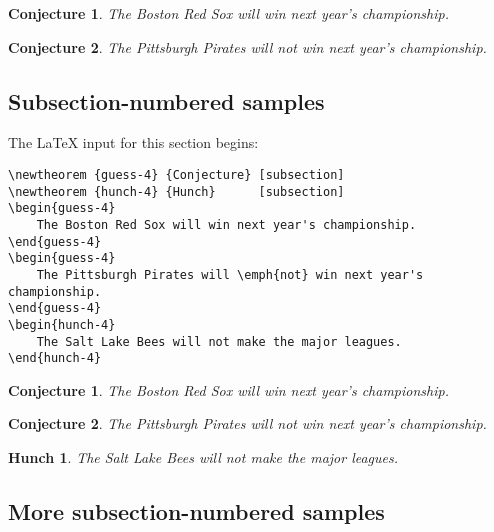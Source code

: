 %
\newtheorem {guess-3} {Conjecture} [section]

\begin{guess-3}
    The Boston Red Sox will win next year's championship.
\end{guess-3}

\begin{guess-3}
    The Pittsburgh Pirates will \emph{not} win next year's championship.
\end{guess-3}


\subsection{Subsection-numbered samples}

The \LaTeX{} input for this section begins:
%
\begin{verbatim}
\newtheorem {guess-4} {Conjecture} [subsection]
\newtheorem {hunch-4} {Hunch}      [subsection]
\begin{guess-4}
    The Boston Red Sox will win next year's championship.
\end{guess-4}
\begin{guess-4}
    The Pittsburgh Pirates will \emph{not} win next year's championship.
\end{guess-4}
\begin{hunch-4}
    The Salt Lake Bees will not make the major leagues.
\end{hunch-4}
\end{verbatim}

%
\newtheorem {guess-4} {Conjecture} [subsection]
\newtheorem {hunch-4} {Hunch}      [subsection]

\begin{guess-4}
    The Boston Red Sox will win next year's championship.
\end{guess-4}

\begin{guess-4}
    The Pittsburgh Pirates will \emph{not} win next year's championship.
\end{guess-4}

\begin{hunch-4}
    The Salt Lake Bees will not make the major leagues.
\end{hunch-4}


\subsection{More subsection-numbered samples}

